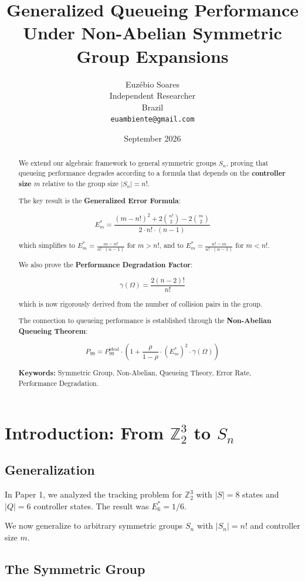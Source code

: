 \documentclass[11pt]{article}
\title{Generalized Queueing Performance Under Non-Abelian Symmetric Group Expansions}
\author{Euz\'{e}bio Soares \\
Independent Researcher \\
Brazil \\
\texttt{euambiente@gmail.com}}
\date{September 2026}
\begin{document}
\maketitle

\begin{abstract}
We extend our algebraic framework to general symmetric groups $S_n$, proving that queueing performance degrades according to a formula that depends on the \textbf{controller size $m$} relative to the group size $|S_n| = n!$.

The key result is the \textbf{Generalized Error Formula}:

$$E_m^* = \frac{(m-n!)^2 + 2\binom{n!}{2} - 2\binom{m}{2}}{2 \cdot n! \cdot (n-1)}$$

which simplifies to $E_m^* = \frac{m-n!}{n! \cdot (n-1)}$ for $m > n!$, and to $E_m^* = \frac{n!-m}{n! \cdot (n-1)}$ for $m < n!$.

We also prove the \textbf{Performance Degradation Factor}:

$$\gamma(\Omega) = \frac{2(n-2)!}{n!}$$

which is now rigorously derived from the number of collision pairs in the group.

The connection to queueing performance is established through the \textbf{Non-Abelian Queueing Theorem}:

$$P_{99} = P_{99}^{\text{ideal}} \cdot \left(1 + \frac{\rho}{1-\rho} \cdot (E_m^*)^2 \cdot \gamma(\Omega)\right)$$

\textbf{Keywords:} Symmetric Group, Non-Abelian, Queueing Theory, Error Rate, Performance Degradation.
\end{abstract}

\section{Introduction: From $\mathbb{Z}_2^3$ to $S_n$}

\subsection{Generalization}

In Paper 1, we analyzed the tracking problem for $\mathbb{Z}_2^3$ with $|S| = 8$ states and $|Q| = 6$ controller states. The result was $E_6^* = 1/6$.

We now generalize to arbitrary symmetric groups $S_n$ with $|S_n| = n!$ and controller size $m$.

\subsection{The Symmetric Group}
\end{document}
